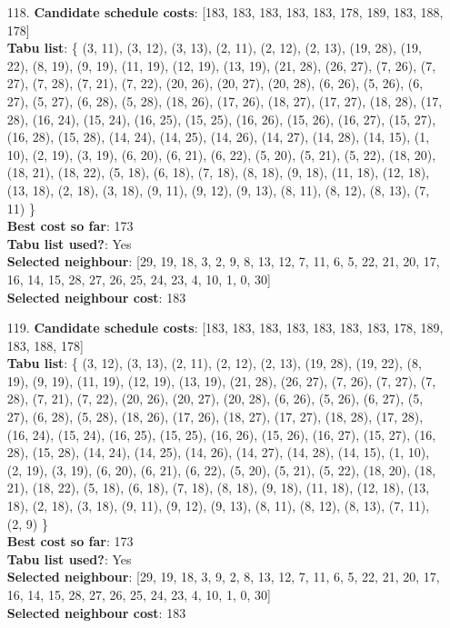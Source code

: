 \documentclass[fleqn]{article}
\begin{document}
\begin{itemize}
    \item[118.] \textbf{Candidate schedule costs}: [183, 183, 183, 183, 183, 178, 189, 183, 188, 178] \\
    \textbf{Tabu list}: \{ (3, 11), (3, 12), (3, 13), (2, 11), (2, 12), (2, 13), (19, 28), (19, 22), (8, 19), (9, 19), (11, 19), (12, 19), (13, 19), (21, 28), (26, 27), (7, 26), (7, 27), (7, 28), (7, 21), (7, 22), (20, 26), (20, 27), (20, 28), (6, 26), (5, 26), (6, 27), (5, 27), (6, 28), (5, 28), (18, 26), (17, 26), (18, 27), (17, 27), (18, 28), (17, 28), (16, 24), (15, 24), (16, 25), (15, 25), (16, 26), (15, 26), (16, 27), (15, 27), (16, 28), (15, 28), (14, 24), (14, 25), (14, 26), (14, 27), (14, 28), (14, 15), (1, 10), (2, 19), (3, 19), (6, 20), (6, 21), (6, 22), (5, 20), (5, 21), (5, 22), (18, 20), (18, 21), (18, 22), (5, 18), (6, 18), (7, 18), (8, 18), (9, 18), (11, 18), (12, 18), (13, 18), (2, 18), (3, 18), (9, 11), (9, 12), (9, 13), (8, 11), (8, 12), (8, 13), (7, 11) \} \\
    \textbf{Best cost so far}: 173 \\
    \textbf{Tabu list used?}: Yes \\
    \textbf{Selected neighbour}: [29, 19, 18, 3, 2, 9, 8, 13, 12, 7, 11, 6, 5, 22, 21, 20, 17, 16, 14, 15, 28, 27, 26, 25, 24, 23, 4, 10, 1, 0, 30] \\
    \textbf{Selected neighbour cost}: 183
      

    \item[119.] \textbf{Candidate schedule costs}: [183, 183, 183, 183, 183, 183, 183, 178, 189, 183, 188, 178] \\
    \textbf{Tabu list}: \{ (3, 12), (3, 13), (2, 11), (2, 12), (2, 13), (19, 28), (19, 22), (8, 19), (9, 19), (11, 19), (12, 19), (13, 19), (21, 28), (26, 27), (7, 26), (7, 27), (7, 28), (7, 21), (7, 22), (20, 26), (20, 27), (20, 28), (6, 26), (5, 26), (6, 27), (5, 27), (6, 28), (5, 28), (18, 26), (17, 26), (18, 27), (17, 27), (18, 28), (17, 28), (16, 24), (15, 24), (16, 25), (15, 25), (16, 26), (15, 26), (16, 27), (15, 27), (16, 28), (15, 28), (14, 24), (14, 25), (14, 26), (14, 27), (14, 28), (14, 15), (1, 10), (2, 19), (3, 19), (6, 20), (6, 21), (6, 22), (5, 20), (5, 21), (5, 22), (18, 20), (18, 21), (18, 22), (5, 18), (6, 18), (7, 18), (8, 18), (9, 18), (11, 18), (12, 18), (13, 18), (2, 18), (3, 18), (9, 11), (9, 12), (9, 13), (8, 11), (8, 12), (8, 13), (7, 11), (2, 9) \} \\
    \textbf{Best cost so far}: 173 \\
    \textbf{Tabu list used?}: Yes \\
    \textbf{Selected neighbour}: [29, 19, 18, 3, 9, 2, 8, 13, 12, 7, 11, 6, 5, 22, 21, 20, 17, 16, 14, 15, 28, 27, 26, 25, 24, 23, 4, 10, 1, 0, 30] \\
    \textbf{Selected neighbour cost}: 183
      


\end{itemize}
\end{document}
